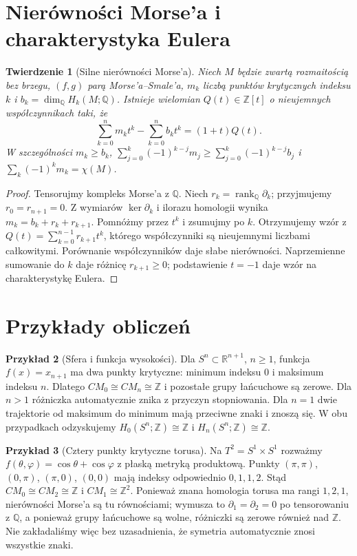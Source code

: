 \documentclass[11pt,a4paper,oneside]{report}
\newcommand{\R}{\mathbb{R}}
\newcommand{\Z}{\mathbb{Z}}
\newcommand{\Q}{\mathbb{Q}}
\theoremstyle{plain}
\newtheorem{twierdzenie}{Twierdzenie}[section]
\theoremstyle{definition}
\newtheorem{przyklad}[twierdzenie]{Przykład}
\theoremstyle{remark}
\begin{document}
\section{Nierówności Morse'a i charakterystyka Eulera}
\begin{twierdzenie}[Silne nierówności Morse'a]
\label{thm:morse-inequalities-v10}
Niech $M$ będzie zwartą rozmaitością bez brzegu, $(f,g)$
parą Morse'a--Smale'a, $m_k$ liczbą punktów krytycznych
indeksu $k$ i $b_k=\dim_\Q H_k(M;\Q)$.
Istnieje wielomian $Q(t)\in\Z[t]$ o nieujemnych współczynnikach taki, że
\[
\sum_{k=0}^{n}m_kt^k-\sum_{k=0}^{n}b_kt^k=(1+t)Q(t).
\]
W szczególności $m_k\ge b_k$,
$\sum_{j=0}^k(-1)^{k-j}m_j\ge
\sum_{j=0}^k(-1)^{k-j}b_j$ i
$\sum_k(-1)^km_k=\chi(M)$.
\end{twierdzenie}
\begin{proof}
Tensorujmy kompleks Morse'a z $\Q$. Niech
$r_k=\operatorname{rank}_\Q\partial_k$; przyjmujemy $r_0=r_{n+1}=0$.
Z wymiarów $\ker\partial_k$ i ilorazu homologii wynika
$m_k=b_k+r_k+r_{k+1}$. Pomnóżmy przez $t^k$
i zsumujmy po $k$. Otrzymujemy wzór z
$Q(t)=\sum_{k=0}^{n-1}r_{k+1}t^k$, którego współczynniki
są nieujemnymi liczbami całkowitymi.
Porównanie współczynników daje słabe nierówności.
Naprzemienne sumowanie do $k$ daje różnicę $r_{k+1}\ge0$;
podstawienie $t=-1$ daje wzór na charakterystykę Eulera.
\end{proof}

\section{Przykłady obliczeń}
\begin{przyklad}[Sfera i funkcja wysokości]
Dla $S^n\subset\R^{n+1}$, $n\ge1$, funkcja
$f(x)=x_{n+1}$ ma dwa punkty krytyczne: minimum indeksu $0$
i maksimum indeksu $n$. Dlatego $CM_0\cong CM_n\cong\Z$
i pozostałe grupy łańcuchowe są zerowe.
Dla $n>1$ różniczka automatycznie znika z przyczyn
stopniowania. Dla $n=1$ dwie trajektorie od maksimum
do minimum mają przeciwne znaki i znoszą się.
W obu przypadkach odzyskujemy $H_0(S^n;\Z)\cong\Z$
i $H_n(S^n;\Z)\cong\Z$.
\end{przyklad}

\begin{przyklad}[Cztery punkty krytyczne torusa]
Na $T^2=S^1\times S^1$ rozważmy
$f(\theta,\varphi)=\cos\theta+\cos\varphi$
z płaską metryką produktową. Punkty $(\pi,\pi)$,
$(0,\pi)$, $(\pi,0)$, $(0,0)$ mają indeksy odpowiednio
$0,1,1,2$. Stąd $CM_0\cong CM_2\cong\Z$ i $CM_1\cong\Z^2$.
Ponieważ znana homologia torusa ma rangi $1,2,1$,
nierówności Morse'a są tu równościami; wymusza to
$\partial_1=\partial_2=0$ po tensorowaniu z $\Q$,
a ponieważ grupy łańcuchowe są wolne, różniczki są zerowe
również nad $\Z$. Nie zakładaliśmy więc bez uzasadnienia,
że symetria automatycznie znosi wszystkie znaki.
\end{przyklad}
\end{document}
